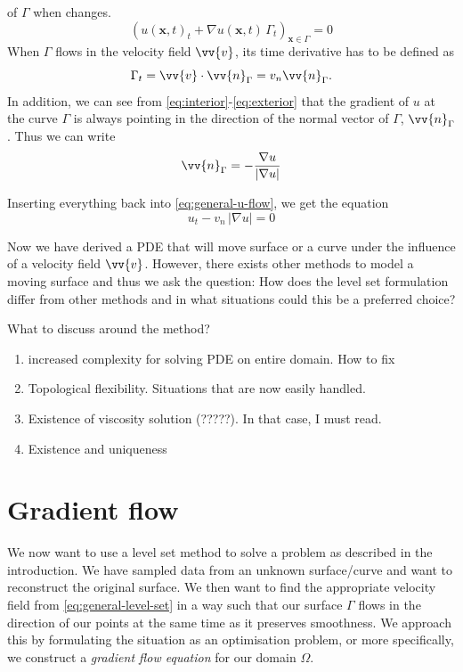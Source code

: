 of $\Gamma$ when \uxt changes.
\begin{equation}
    (u(\mathbf{x}, t)_t + \nabla u(\mathbf{x}, t) \, \Gamma_t)_{\mathbf{x}\in \Gamma} = 0
    \label{eq:general-u-flow}
\end{equation}
When $\Gamma$ flows in the velocity field $\vv{v}$, its time derivative has to be 
defined as 
\begin{equation}
    \Gamma_t = \vv{v}\cdot \vv{n}_{\Gamma} = v_n \vv{n}_{\Gamma}.
\end{equation}
In addition, we can see from \eqref{eq:interior}-\eqref{eq:exterior} that the gradient 
of $u$ at the curve $\Gamma$ is always pointing in the direction of the normal vector of 
$\Gamma$, $\vv{n}_{\Gamma}$. Thus we can write 
\begin{equation}
    \vv{n}_{\Gamma} = -\frac{\nabla u}{|\nabla u|}
\end{equation}

Inserting everything back into \eqref{eq:general-u-flow}, we get the equation
\begin{equation}
    u_t - v_n\, |\nabla u| = 0
    \label{eq:general-level-set}
\end{equation}

Now we have derived a PDE that will move surface or a curve under the influence
of a velocity field $\vv{v}$. However, there exists other methods to model
a moving surface and thus we ask the question: How does the level set 
formulation differ from other methods and in what situations could this be 
a preferred choice?




What to discuss around the method?
\begin{enumerate}
    \item increased complexity for solving PDE on entire domain. How to fix
    \item Topological flexibility. Situations that are now easily handled.
    \item Existence of viscosity solution (?????). In that case, I must read.
    \item Existence and uniqueness
\end{enumerate}

\newpage
\section{Gradient flow}
We now want to use a level set method to solve a problem as described in the
introduction. We have sampled data from an unknown surface/curve and want to
reconstruct the original surface. We then want to find the appropriate velocity
field from \eqref{eq:general-level-set} in a way such that our surface $\Gamma$ 
flows in the direction of our points at the same time as it preserves smoothness. We
approach this by formulating the situation as an optimisation problem, or more
specifically, we construct a \textit{gradient flow equation} for our domain $\Omega$. 

